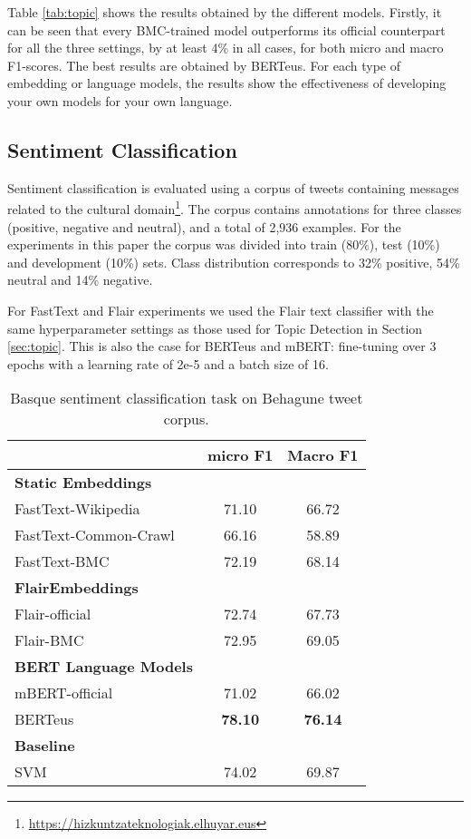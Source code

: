 \documentclass[10pt, a4paper]{article}
\begin{document}
Table \ref{tab:topic} shows the results obtained by the different models. Firstly, it can be seen that every BMC-trained model outperforms its official counterpart for all the three settings, by at least 4\% in all cases, for both micro and macro F1-scores. The best results are obtained by BERTeus. For each type of embedding or language models, the results show the effectiveness of developing your own models for your own language.

\subsection{Sentiment Classification}\label{sec:polarity}

Sentiment classification is evaluated using a corpus of tweets containing messages related to the cultural domain\footnote{\scriptsize{\url{https://hizkuntzateknologiak.elhuyar.eus}}}. The corpus contains annotations for three classes (positive, negative and neutral), and a total of 2,936 examples. For the experiments in this paper the corpus was divided into train (80\%), test (10\%) and development (10\%) sets. Class distribution corresponds to 32\% positive, 54\% neutral and 14\% negative.

For FastText and Flair experiments we used the Flair text classifier with the same hyperparameter settings as those used for Topic Detection in Section \ref{sec:topic}. This is also the case for BERTeus and mBERT: fine-tuning over 3 epochs with a learning rate of 2e-5 and a batch size of 16.

\begin{table}[!ht]\small
\centering
\begin{tabular}{@{\hspace{0.3cm}}lcc} \hline
 {\textbf{}} & {\textbf{micro F1}} &  {\textbf{Macro F1}} \\ \hline
\textbf{Static Embeddings} & & \\
FastText-Wikipedia & 71.10 &	66.72 \\
FastText-Common-Crawl & 66.16 & 58.89  \\
FastText-BMC  & 72.19 &	68.14 \\
\hline%
\textbf{FlairEmbeddings}\\
Flair-official & 72.74 & 67.73 \\
Flair-BMC  & 72.95	& 69.05 \\ \hline
\textbf{BERT Language Models}\\
mBERT-official  & 71.02 & 66.02 \\
BERTeus  & \textbf{78.10}	& \textbf{76.14} \\
\hline
\textbf{Baseline} \\
SVM \cite{san2019multilingual} & 74.02 & 69.87\\ \hline
\end{tabular}
\caption{Basque sentiment classification task on Behagune tweet corpus.}\label{tab:sentiment}
\end{table}
\end{document}
